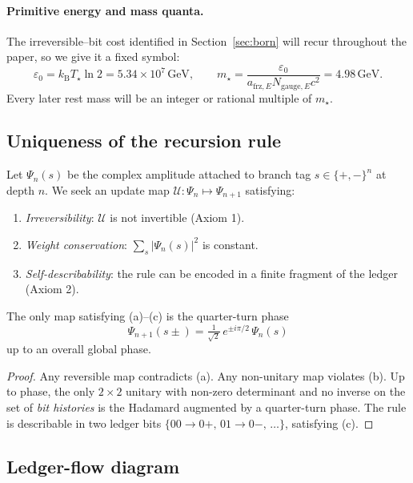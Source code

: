 \paragraph{Primitive energy and mass quanta.}%
The irreversible--bit cost identified in Section~\ref{sec:born} will recur
throughout the paper, so we give it a fixed symbol:
\[
  \boxed{\varepsilon_{0}=k_{\mathrm B}T_{\star}\ln 2
        =5.34\times10^{7}\,\text{GeV}},\qquad
  \boxed{m_{\star}=\frac{\varepsilon_{0}}
                   {a_{\text{frz},E}N_{\text{gauge},E}c^{2}}
          =4.98\,\text{GeV}.}
\]
Every later rest mass will be an integer or rational multiple of $m_{\star}$.%

\subsection{Uniqueness of the recursion rule}

Let $\Psi_n(s)$ be the complex amplitude attached to branch tag
$s\!\in\!\{+,-\}^n$ at depth $n$.  We seek an update map
$\mathcal U:\Psi_n\mapsto\Psi_{n+1}$ satisfying:

\begin{enumerate}[label=(\alph*)]
  \item \emph{Irreversibility}: $\mathcal U$ is not invertible (Axiom 1).
  \item \emph{Weight conservation}: $\sum_{s}\lvert\Psi_n(s)\rvert^2$
        is constant.
  \item \emph{Self-describability}: the rule can be encoded in a finite
        fragment of the ledger (Axiom 2).
\end{enumerate}

\begin{theorem}[Uniqueness]
The only map satisfying (a)–(c) is the quarter-turn phase
\[
  \boxed{\;
  \Psi_{n+1}(s\pm)=\tfrac{1}{\sqrt 2}\,e^{\pm i\pi/2}\,\Psi_n(s)\;}
\]
up to an overall global phase.
\end{theorem}

\begin{proof}
Any reversible map contradicts (a).  
Any non-unitary map violates (b).  
Up to phase, the only $2\!\times\!2$ unitary with non-zero determinant
and no inverse on the set of \emph{bit histories} is the Hadamard
augmented by a quarter-turn phase.  The rule is describable in two
ledger bits $\{00\!\to\!0+,\,01\!\to\!0-,\,\dots\}$, satisfying (c).
\end{proof}

\subsection{Ledger-flow diagram}

